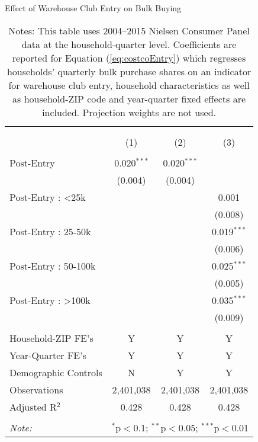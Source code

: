 \begin{table}[!htbp] \centering
  \caption{Effect of Warehouse Club Entry on Bulk Buying}
  \label{tab:costcoEntryDD}
\begin{tabular}{@{\extracolsep{5pt}}lccc}
\\[-1.8ex]\hline
\hline \\[-1.8ex]
\\[-1.8ex] & (1) & (2) & (3)\\
\hline \\[-1.8ex]
 Post-Entry & 0.020$^{***}$ & 0.020$^{***}$ &  \\
  & (0.004) & (0.004) &  \\
  Post-Entry : <25k &  &  & 0.001 \\
  &  &  & (0.008) \\
  Post-Entry : 25-50k &  &  & 0.019$^{***}$ \\
  &  &  & (0.006) \\
  Post-Entry : 50-100k &  &  & 0.025$^{***}$ \\
  &  &  & (0.005) \\
  Post-Entry : >100k &  &  & 0.035$^{***}$ \\
  &  &  & (0.009) \\
 \hline \\[-1.8ex]
Household-ZIP FE's & Y & Y & Y \\
Year-Quarter FE's & Y & Y & Y \\
Demographic Controls & N & Y & Y \\
Observations & 2,401,038 & 2,401,038 & 2,401,038 \\
Adjusted R$^{2}$ & 0.428 & 0.428 & 0.428 \\
\hline
\hline \\[-1.8ex]
\textit{Note:}  & \multicolumn{3}{l}{$^{*}$p$<$0.1; $^{**}$p$<$0.05; $^{***}$p$<$0.01} \\
\end{tabular}
\caption*{Notes: This table uses 2004--2015 Nielsen Consumer Panel data at the household-quarter level. Coefficients are reported for Equation (\ref{eq:costcoEntry}) which regresses households' quarterly bulk purchase shares on an indicator for warehouse club entry, household characteristics as well as household-ZIP code and year-quarter fixed effects are included. Projection weights are not used.}
\end{table}
